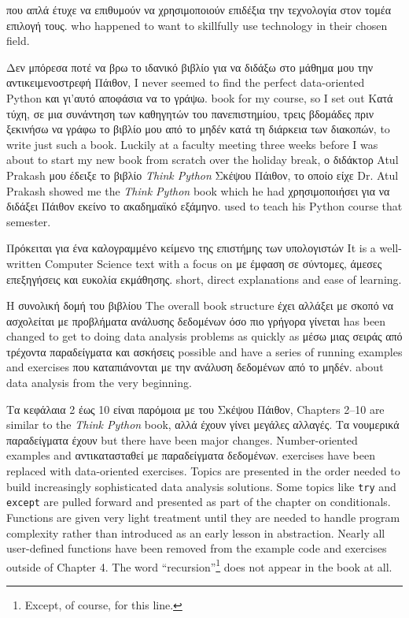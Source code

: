 που απλά έτυχε να επιθυμούν να χρησιμοποιούν επιδέξια την τεχνολογία στον τομέα επιλογή τους.
who happened to want to skillfully use technology in their chosen field.

Δεν μπόρεσα ποτέ να βρω το ιδανικό βιβλίο για να διδάξω στο μάθημα μου την αντικειμενοστρεφή Πάιθον,
I never seemed to find the perfect data-oriented Python
και γι'αυτό αποφάσια να το γράψω.
book for my course, so I set out 
Κατά τύχη, σε μια συνάντηση των καθηγητών του πανεπιστημίου, τρεις βδομάδες πριν ξεκινήσω να γράφω το βιβλίο μου από το μηδέν κατά τη διάρκεια των διακοπών, 
to write just such a book.  Luckily at a faculty meeting three weeks
before I was about to start my new book from scratch over 
the holiday break, 
ο διδάκτορ Atul Prakash μου έδειξε το βιβλίο \emph{Think Python} Σκέψου Πάιθον, το οποίο είχε   
Dr. Atul Prakash showed me the \emph{Think Python} book which he had
χρησιμοποιήσει για να διδάξει Πάιθον εκείνο το ακαδημαϊκό εξάμηνο.
used to teach his Python course that semester.  

Πρόκειται για ένα καλογραμμένο κείμενο της επιστήμης των υπολογιστών 
It is a well-written Computer Science text with a focus on 
με έμφαση σε σύντομες, άμεσες επεξηγήσεις και ευκολία εκμάθησης.
short, direct explanations and ease of learning.  

Η συνολική δομή του βιβλίου
The overall book structure
έχει αλλάξει με σκοπό να ασχολείται με προβλήματα ανάλυσης δεδομένων όσο πιο γρήγορα γίνεται
has been changed to get to doing data analysis problems as quickly as
μέσω μιας σειράς από τρέχοντα παραδείγματα και ασκήσεις
possible and have a series of running examples and exercises 
που καταπιάνονται με την ανάλυση δεδομένων από το μηδέν.
about data analysis from the very beginning.  

Τα κεφάλαια 2 έως 10 είναι παρόμοια με του Σκέψου Πάιθον,
Chapters 2--10 are similar to the \emph{Think Python} book,
αλλά έχουν γίνει μεγάλες αλλαγές. Τα νουμερικά παραδείγματα έχουν 
but there have been major changes. Number-oriented examples and
αντικατασταθεί με παραδείγματα δεδομένων. 
exercises have been replaced with data-oriented exercises.
Topics are presented in the order needed to build increasingly
sophisticated data analysis solutions. Some topics like {\tt try} and
{\tt except} are pulled forward and presented as part of the chapter
on conditionals.  Functions are given very light treatment until 
they are needed to handle program complexity rather than introduced 
as an early lesson in abstraction.  Nearly all user-defined functions
have been removed from the example code and exercises outside of Chapter 4.
The word ``recursion''\footnote{Except, of course, for this line.}
does not appear in the book at all.

